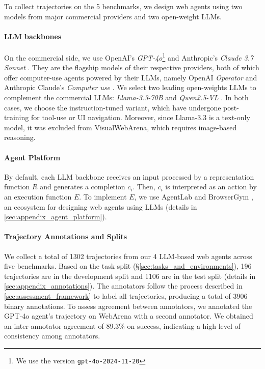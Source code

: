 \documentclass{article} %
\begin{document}
To collect trajectories on the 5 benchmarks, we design web agents using two models from major commercial providers and two open-weight LLMs.

\paragraph{LLM backbones}
On the commercial side, we use OpenAI's \textit{GPT-4o}\footnote{We use the version \texttt{gpt-4o-2024-11-20}} \citep{openai2024gpt4ocard} and Anthropic's \textit{Claude 3.7 Sonnet} \citep{anthropicclaude}. They are the flagship models of their respective providers, both of which offer computer-use agents powered by their LLMs, namely OpenAI \textit{Operator} \citep{OpenAI_Operator_2025} and Anthropic Claude's \textit{Computer use} \citep{Anthropic_Computer_Use_2024}. We select two leading open-weights LLMs to complement the commercial LLMs: \textit{Llama-3.3-70B} \citep{grattafiori2024llama} and \textit{Qwen2.5-VL} \citep{qwen_25_vl}. In both cases, we choose the instruction-tuned variant, which have undergone post-training for tool-use or UI navigation. Moreover, since Llama-3.3 is a text-only model, it was excluded from VisualWebArena, which requires image-based reasoning.

\paragraph{Agent Platform}
By default, each LLM backbone receives an input processed by a representation function $R$ and generates a completion $c_i$. Then, $c_i$ is interpreted as an action by an execution function $E$. To implement $E$, we use AgentLab and BrowserGym \citep{browsergym_platform}, an ecosystem for designing web agents using LLMs (details in \cref{sec:appendix_agent_platform}).


\paragraph{Trajectory Annotations and Splits}
We collect a total of 1302 trajectories from our 4 LLM-based web agents across five benchmarks. Based on the task split (\S\ref{sec:tasks_and_environments}), 196 trajectories are in the development split and 1106 are in the test split (details in \ref{sec:appendix_annotations}). The annotators follow the process described in \cref{sec:assessment_framework} to label all trajectories, producing a total of 3906 binary annotations. To assess agreement between annotators, we annotated the GPT-4o agent's trajectory on WebArena with a second annotator. We obtained an inter-annotator agreement of 89.3\% on success, indicating a high level of consistency among annotators.
\end{document}
